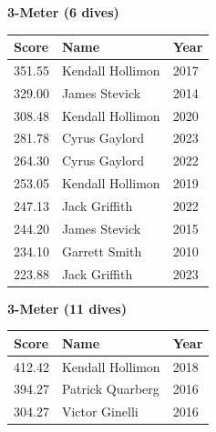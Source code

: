 \noindent\begin{minipage}[t]{0.48\textwidth}
\centering
\textbf{\textcolor{teamprimary}{3-Meter (6 dives)}}\par
\vspace{0.5em}
\centering
\small
\renewcommand{\arraystretch}{1.0}
\setlength{\tabcolsep}{4pt}
\begin{tabular}{@{}p{1.8cm}p{3.0cm}p{1.0cm}@{}}
\toprule
\textbf{Score} & \textbf{Name} & \textbf{Year} \\
\midrule
351.55 & Kendall Hollimon & 2017 \\
329.00 & James Stevick & 2014 \\
308.48 & Kendall Hollimon & 2020 \\
281.78 & Cyrus Gaylord & 2023 \\
264.30 & Cyrus Gaylord & 2022 \\
253.05 & Kendall Hollimon & 2019 \\
247.13 & Jack Griffith & 2022 \\
244.20 & James Stevick & 2015 \\
234.10 & Garrett Smith & 2010 \\
223.88 & Jack Griffith & 2023 \\
\bottomrule
\end{tabular}
\end{minipage}
\hfill
\begin{minipage}[t]{0.48\textwidth}
\centering
\textbf{\textcolor{teamprimary}{3-Meter (11 dives)}}\par
\vspace{0.5em}
\centering
\small
\renewcommand{\arraystretch}{1.0}
\setlength{\tabcolsep}{4pt}
\begin{tabular}{@{}p{1.8cm}p{3.0cm}p{1.0cm}@{}}
\toprule
\textbf{Score} & \textbf{Name} & \textbf{Year} \\
\midrule
412.42 & Kendall Hollimon & 2018 \\
394.27 & Patrick Quarberg & 2016 \\
304.27 & Victor Ginelli & 2016 \\
\bottomrule
\end{tabular}
\end{minipage}
\vspace{1.2em}
